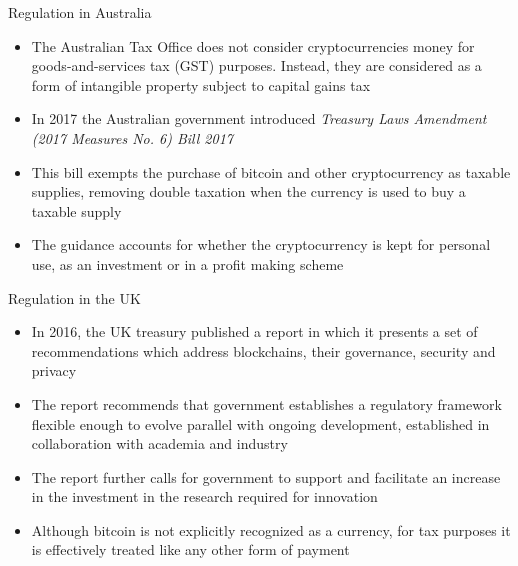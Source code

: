 \documentclass[11pt]{beamer}
\begin{document}
\begin{frame}{Regulation in Australia}
	\begin{itemize}
		\item The Australian Tax Office does not consider cryptocurrencies money for goods-and-services tax (GST) purposes. Instead, they are considered as a form of intangible property subject to capital gains tax
		\item In 2017 the Australian government introduced \textit{Treasury Laws Amendment (2017 Measures No. 6) Bill 2017}
		\item This bill exempts the purchase of bitcoin and other cryptocurrency as taxable supplies, removing double taxation when the currency is used to buy a taxable supply
		\item The guidance accounts for whether the cryptocurrency is kept for personal use, as an investment or in a profit making scheme
	\end{itemize}
\end{frame}


\begin{frame}{Regulation in the UK}
	\begin{itemize}
		\item In 2016, the UK treasury published a report in which it presents a set of recommendations which address blockchains, their governance, security and privacy
		\item The report recommends that government establishes a regulatory framework flexible enough to evolve parallel with ongoing development, established in collaboration with academia and industry
		\item The report further calls for government to support and facilitate an increase in the investment in the research required for innovation
		\item Although bitcoin is not explicitly recognized as a currency, for tax purposes it is effectively treated like any other form of payment
	\end{itemize}
\end{frame}

\end{document}
